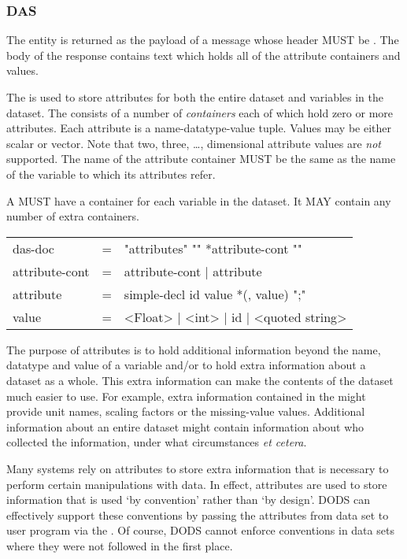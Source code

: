 \documentclass[justify]{dods-paper}
\begin{document}
\subsubsection{DAS}
\label{sec-das}
The \DAS entity is returned as the payload of a message whose
 header MUST be . The body of the
response contains text which holds all of the attribute containers and
values.

The \DAS is used to store attributes for both the entire dataset and
variables in the dataset. The \DAS consists of a number of
\emph{containers} each of which hold zero or more attributes. Each attribute
is a name-datatype-value tuple. Values may be either scalar or vector. Note
that two, three, \ldots, dimensional attribute values are \emph{not}
supported.  The name of the attribute container MUST be the same as
the name of the variable to which its attributes refer.

A \DAS MUST have a container for each variable in the dataset. It MAY
contain any number of extra containers.

\begin{ttfamily}
\begin{center}
\begin{tabular}{lll}
das-doc & = & "attributes" "{" *attribute-cont "}" \\
attribute-cont & = & attribute-cont | attribute \\
attribute & = & simple-decl id value *(, value) ";" \\
value & = & <Float> | <int> | id | <quoted string> \\
\end{tabular}
\end{center}
\end{ttfamily}

The purpose of attributes is to hold additional information beyond the name,
datatype and value of a variable and/or to hold extra information about a
dataset as a whole. This extra information can make the contents of the
dataset much easier to use. For example, extra information contained in the
\DAS might provide unit names, scaling factors or the missing-value
values. Additional information about an entire dataset might contain
information about who collected the information, under what circumstances
\emph{et cetera}. 

Many systems rely on attributes to store extra information that is necessary
to perform certain manipulations with data. In effect, attributes are used to
store information that is used `by convention' rather than `by design'.
\ac{DODS} can effectively support these conventions by passing the attributes
from data set to user program via the \DAS. Of course, \ac{DODS} cannot
enforce conventions in data sets where they were not followed in the first
place.
\end{document}

